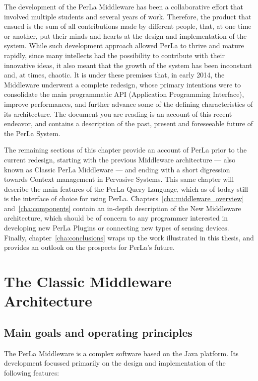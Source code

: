 The development of the PerLa Middleware has been a collaborative effort that
involved multiple students and several years of work. Therefore, the product
that ensued is the sum of all contributions made by different people, that, at
one time or another, put their minds and hearts at the design and
implementation of the system. While such development approach allowed PerLa to
thrive and mature rapidly, since many intellects had the possibility to
contribute with their innovative ideas, it also meant that the growth of the
system has been inconstant and, at times, chaotic. It is under these premises
that, in early 2014, the Middleware underwent a complete redesign, whose
primary intentions were to consolidate the main programmatic API (Application
Programming Interface), improve performances, and further advance some of the
defining characteristics of its architecture. The document you are reading is
an account of this recent endeavor, and contains a description of the past,
present and foreseeable future of the PerLa System.

The remaining sections of this chapter provide an account of PerLa prior to the
current redesign, starting with the previous Middleware architecture --- also
known as Classic PerLa Middleware --- and ending with a short digression
towards Context management in Pervasive Systems. This same chapter will
describe the main features of the PerLa Query Language, which as of today still
is the interface of choice for using PerLa.
Chapters~\ref{cha:middleware_overview} and~\ref{cha:components} contain an
in-depth description of the New Middleware architecture, which should be of
concern to any programmer interested in developing new PerLa Plugins or
connecting new types of sensing devices. Finally, chapter~\ref{cha:conclusions}
wraps up the work illustrated in this thesis, and provides an outlook on the
prospects for PerLa's future.


\section{The Classic Middleware Architecture}

\subsection{Main goals and operating principles}

The PerLa Middleware is a complex software based on the Java platform. Its
development focussed primarily on the design and implementation of the
following features:

